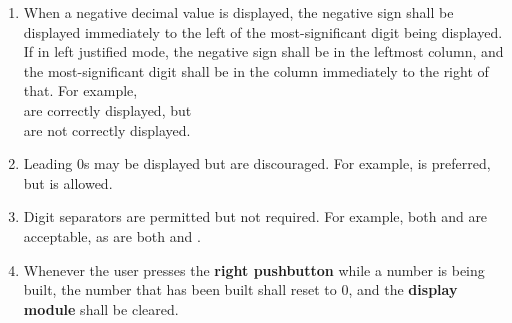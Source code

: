 \begin{enumerate}
\begin{enumerate}
        \item When a negative decimal value is displayed, the negative sign shall be displayed immediately to the left of the most-significant digit being displayed.
            If in left justified mode, the negative sign shall be in the leftmost column, and the most-significant digit shall be in the column immediately to the right of that.
            For example, \\  \hspace{5mm}  are correctly displayed, but \\  \hspace{5mm}  \hspace{5mm}  are not correctly displayed.
        \item Leading 0s may be displayed but are discouraged.
            For example,  is preferred, but  is allowed.
        \item Digit separators are permitted but not required.
            For example, both  and  are acceptable, as are both  and .
        \item \label{spec:clearNumber} Whenever the user presses the \textbf{right pushbutton} while a number is being built, the number that has been built shall reset to 0, and the \textbf{display module} shall be cleared.

\end{enumerate}
\end{enumerate}
